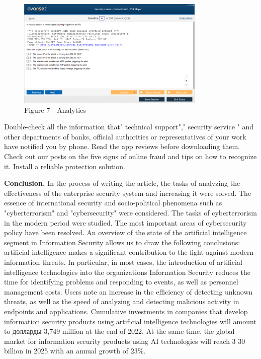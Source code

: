 \begin{figure}[H]
	\centering
	\includegraphics[width=0.8\textwidth]{assets/69}
	\caption*{Figure 7 - Analytics}
\end{figure}

\begin{multicols}{2}
Double-check all the information that" technical support"," security
service " and other departments of banks, official authorities or
representatives of your work have notified you by phone. Read the app
reviews before downloading them. Check out our posts on the five signs
of online fraud and tips on how to recognize it. Install a reliable
protection solution.

{\bfseries Conclusion.} In the process of writing the article, the tasks of
analyzing the effectiveness of the enterprise security system and
increasing it were solved. The essence of international security and
socio-political phenomena such as "cyberterrorism" and "cybersecurity"
were considered. The tasks of cyberterrorism in the modern period were
studied. The most important areas of cybersecurity policy have been
resolved. An overview of the state of the artificial intelligence
segment in Information Security allows us to draw the following
conclusions: artificial intelligence makes a significant contribution to
the fight against modern information threats. In particular, in most
cases, the introduction of artificial intelligence technologies into the
organization\textquotesingle s Information Security reduces the time for
identifying problems and responding to events, as well as personnel
management costs. Users note an increase in the efficiency of detecting
unknown threats, as well as the speed of analyzing and detecting
malicious activity in endpoints and applications. Cumulative investments
in companies that develop information security products using artificial
intelligence technologies will amount to долларды 3,749 million at the
end of 2022. At the same time, the global market for information
security products using AI technologies will reach 3 30 billion in 2025
with an annual growth of 23\%.
\end{multicols}

